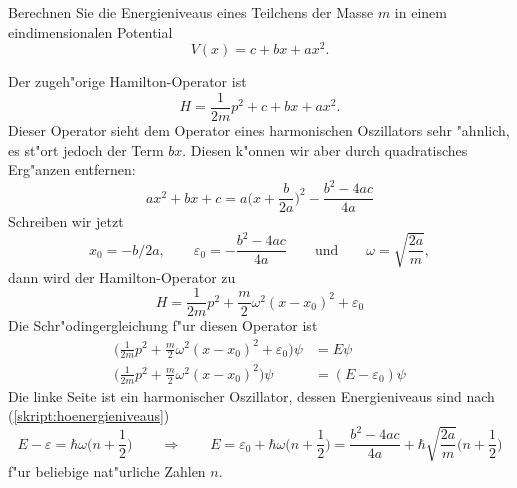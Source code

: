 Berechnen Sie die Energieniveaus eines Teilchens der Masse $m$ in einem
eindimensionalen Potential
\[
V(x)=c+bx+ax^2.
\]

\begin{loesung}
Der zugeh"orige Hamilton-Operator ist
\[
H=\frac1{2m}p^2 + c+bx+ax^2.
\]
Dieser Operator sieht dem Operator eines harmonischen Oszillators sehr
"ahnlich, es st"ort jedoch der Term $bx$.
Diesen k"onnen wir aber durch quadratisches Erg"anzen entfernen:
\[
ax^2+bx+c
=
a\biggl(x+\frac{b}{2a}\biggr)^2-\frac{b^2-4ac}{4a}
\]
Schreiben wir jetzt
\[
x_0=-b/2a,\qquad
\varepsilon_0=-\frac{b^2-4ac}{4a}
\qquad\text{und}\qquad
\omega=\sqrt{\frac{2a}{m}},
\]
dann wird der Hamilton-Operator zu
\[
H=\frac1{2m}p^2 +
\frac{m}{2}\omega^2(x-x_0)^2
+\varepsilon_0
\]
Die Schr"odingergleichung f"ur diesen Operator ist
\begin{align*}
\biggl(
\frac1{2m}p^2 +
\frac{m}{2}\omega^2(x-x_0)^2
+\varepsilon_0
\biggr)\psi&=E\psi
\\
\biggl(
\frac1{2m}p^2 +
\frac{m}{2}\omega^2(x-x_0)^2
\biggr)\psi&=(E-\varepsilon_0)\psi
\end{align*}
Die linke Seite ist ein harmonischer Oszillator, dessen Energieniveaus
sind nach (\ref{skript:hoenergieniveaus})
\[
E-\varepsilon=\hbar\omega\biggl(n+\frac12\biggr)
\qquad\Rightarrow\qquad
E=\varepsilon_0+\hbar\omega\biggl(n+\frac12\biggr)
=\frac{b^2-4ac}{4a}+\hbar\sqrt{\frac{2a}{m}}\biggl(n+\frac12\biggr)
\]
f"ur beliebige nat"urliche Zahlen $n$.
\end{loesung}

